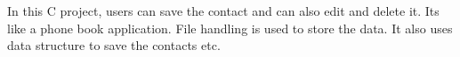 In this C project, users can save the contact and can also edit and delete it. It\textquotesingle{}s like a phone book application. File handling is used to store the data. It also uses data structure to save the contacts etc. 
